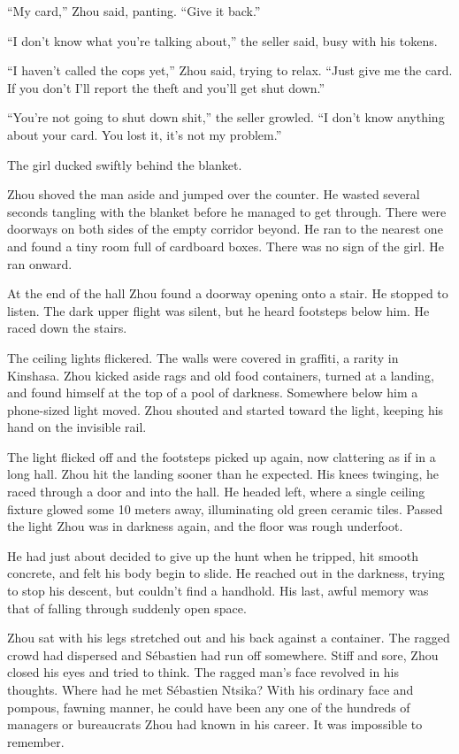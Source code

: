\documentclass[10pt,a4paper]{article}
\begin{document}
``My card,'' Zhou said, panting. ``Give it back.''

``I don't know what you're talking about,'' the seller said, busy
with his tokens.

``I haven't called the cops yet,'' Zhou said, trying to relax.
``Just give me the card. If you don't I'll report the theft and
you'll get shut down.''

``You're not going to shut down shit,'' the seller growled. ``I don't
know anything about your card. You lost it, it's not my problem.''

The girl ducked swiftly behind the blanket.

Zhou shoved the man aside and jumped over the counter. He wasted
several seconds tangling with the blanket before he managed to get
through. There were doorways on both sides of the empty corridor
beyond. He ran to the nearest one and found a tiny room full of
cardboard boxes. There was no sign of the girl. He ran onward.

At the end of the hall Zhou found a doorway opening onto a stair. He
stopped to listen. The dark upper flight was silent, but he heard
footsteps below him. He raced down the stairs.

The ceiling lights flickered. The walls were covered in graffiti,
a rarity in Kinshasa. Zhou kicked aside rags and old food
containers, turned at a landing, and found himself at the top of
a pool of darkness. Somewhere below him a phone-sized light moved.
Zhou shouted and started toward the light, keeping his hand on the
invisible rail.

The light flicked off and the footsteps picked up again, now
clattering as if in a long hall. Zhou hit the landing sooner than he
expected. His knees twinging, he raced through a door and into the
hall. He headed left, where a single ceiling fixture glowed some
10 meters away, illuminating old green ceramic tiles. Passed the
light Zhou was in darkness again, and the floor was rough underfoot.

He had just about decided to give up the hunt when he tripped,
hit smooth concrete, and felt his body begin to slide. He reached
out in the darkness, trying to stop his descent, but couldn't find
a handhold. His last, awful memory was that of falling through
suddenly open space.

\bigskip

Zhou sat with his legs stretched out and his back against a
container. The ragged crowd had dispersed and S\'{e}bastien had run
off somewhere. Stiff and sore, Zhou closed his eyes and tried to
think. The ragged man's face revolved in his thoughts. Where had he
met S\'{e}bastien Ntsika? With his ordinary face and pompous, fawning
manner, he could have been any one of the hundreds of managers
or bureaucrats Zhou had known in his career. It was impossible
to remember.
\end{document}
